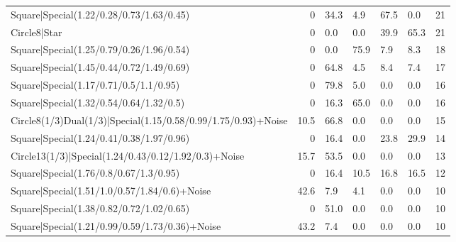 \begin{tabular}{lrllllr}
 Square|Special(1.22/0.28/0.73/1.63/0.45)                      &             0   & 34.3           & 4.9             & 67.5            & 0.0             &           21 \\
 Circle8|Star                                                  &             0   & 0.0            & 0.0             & 39.9            & 65.3            &           21 \\
 Square|Special(1.25/0.79/0.26/1.96/0.54)                      &             0   & 0.0            & 75.9            & 7.9             & 8.3             &           18 \\
 Square|Special(1.45/0.44/0.72/1.49/0.69)                      &             0   & 64.8           & 4.5             & 8.4             & 7.4             &           17 \\
 Square|Special(1.17/0.71/0.5/1.1/0.95)                        &             0   & 79.8           & 5.0             & 0.0             & 0.0             &           16 \\
 Square|Special(1.32/0.54/0.64/1.32/0.5)                       &             0   & 16.3           & 65.0            & 0.0             & 0.0             &           16 \\
 Circle8(1/3)Dual(1/3)|Special(1.15/0.58/0.99/1.75/0.93)+Noise &            10.5 & 66.8           & 0.0             & 0.0             & 0.0             &           15 \\
 Square|Special(1.24/0.41/0.38/1.97/0.96)                      &             0   & 16.4           & 0.0             & 23.8            & 29.9            &           14 \\
 Circle13(1/3)|Special(1.24/0.43/0.12/1.92/0.3)+Noise          &            15.7 & 53.5           & 0.0             & 0.0             & 0.0             &           13 \\
 Square|Special(1.76/0.8/0.67/1.3/0.95)                        &             0   & 16.4           & 10.5            & 16.8            & 16.5            &           12 \\
 Square|Special(1.51/1.0/0.57/1.84/0.6)+Noise                  &            42.6 & 7.9            & 4.1             & 0.0             & 0.0             &           10 \\
 Square|Special(1.38/0.82/0.72/1.02/0.65)                      &             0   & 51.0           & 0.0             & 0.0             & 0.0             &           10 \\
 Square|Special(1.21/0.99/0.59/1.73/0.36)+Noise                &            43.2 & 7.4            & 0.0             & 0.0             & 0.0             &           10 \\

\end{tabular}
